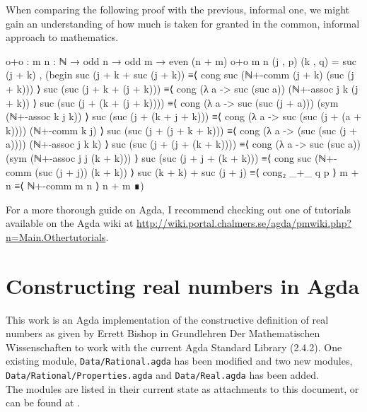 \documentclass[11pt,a4paper]{article}
\begin{document}
When comparing the following proof with the previous, informal one, we might gain an understanding of how much is taken for granted in the common, informal approach to mathematics. 
\begin{code}
o+o : {m n : ℕ} → odd n → odd m → even (n + m)
o+o {m} {n} (j , p) (k , q) = suc (j + k) , 
  (begin 
    suc (j + k + suc (j + k)) 
≡⟨ cong suc (ℕ+-comm (j + k) (suc (j + k)))  ⟩ 
    suc (suc (j + k + (j + k))) 
≡⟨ cong (λ a -> suc (suc a)) (ℕ+-assoc j k (j + k))  ⟩ 
    suc (suc (j + (k + (j + k)))) 
≡⟨ cong (λ a -> suc (suc (j + a))) (sym (ℕ+-assoc k j k))  ⟩ 
    suc (suc (j + (k + j + k))) 
≡⟨ cong (λ a -> suc (suc (j + (a + k)))) (ℕ+-comm k j)  ⟩
    suc (suc (j + (j + k + k))) 
≡⟨ cong (λ a -> (suc (suc (j + a)))) (ℕ+-assoc j k k)  ⟩ 
    suc (suc (j + (j + (k + k)))) 
≡⟨ cong (λ a -> suc (suc a)) (sym (ℕ+-assoc j j (k + k)))  ⟩ 
    suc (suc (j + j + (k + k))) 
≡⟨ cong suc (ℕ+-comm (suc (j + j)) (k + k)) ⟩ 
    suc (k + k) + suc (j + j) ≡⟨ cong₂ _+_  q p  ⟩ 
    m + n ≡⟨ ℕ+-comm m n  ⟩ 
    n + m
  ∎)
\end{code}
For a more thorough guide on Agda, I recommend checking out one of tutorials available on the Agda wiki at \url{http://wiki.portal.chalmers.se/agda/pmwiki.php?n=Main.Othertutorials}.

\section{Constructing real numbers in Agda}\label{sec: reals in agda}
This work is an Agda implementation of the constructive definition of real numbers as given by Errett Bishop in Grundlehren Der Mathematischen Wissenschaften \cite{bishop:85} to work with the current Agda Standard Library (2.4.2). One existing module, \texttt{Data/Rational.agda} has been modified and two new modules, \texttt{Data/Rational/Properties.agda} and \texttt{Data/Real.agda} has been added.\\
The modules are listed in their current state as attachments to this document, or can be found at .\\
\end{document}

